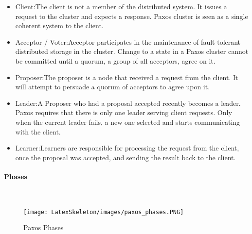 \documentclass[oneside,12pt]{book}
\newcommand{\myparagraph}[1]{\paragraph{#1}\mbox{}\\}
\begin{document}
\begin{itemize}
  \item Client:\smallskip \newline The client is not a member of the distributed system. It issues a request to the cluster and expects a response. Paxos cluster is seen as a single coherent system to the client.
  \item Acceptor / Voter:\smallskip \newline Acceptor participates in the maintenance of fault-tolerant distributed storage in the cluster. Change to a state in a Paxos cluster cannot be committed until a quorum, a group of all acceptors, agree on it.
  \item Proposer:\smallskip \newline The proposer is a node that received a request from the client. It will attempt to persuade a quorum of acceptors to agree upon it.
  \item Leader:\smallskip \newline A Proposer who had a proposal accepted recently becomes a leader. Paxos requires that there is only one leader serving client requests. Only when the current leader fails, a new one selected and starts communicating with the client. 
  \item Learner:\smallskip \newline Learners are responsible for processing the request from the client, once the proposal was accepted, and sending the result back to the client.
\end{itemize}

\pagebreak

\myparagraph{Phases}
\begin{figure}[H]
\centering
\texttt{[image: LatexSkeleton/images/paxos\_phases.PNG]}
\caption{Paxos Phases}\citep{lamport2001paxos}
\end{figure}
\end{document}
